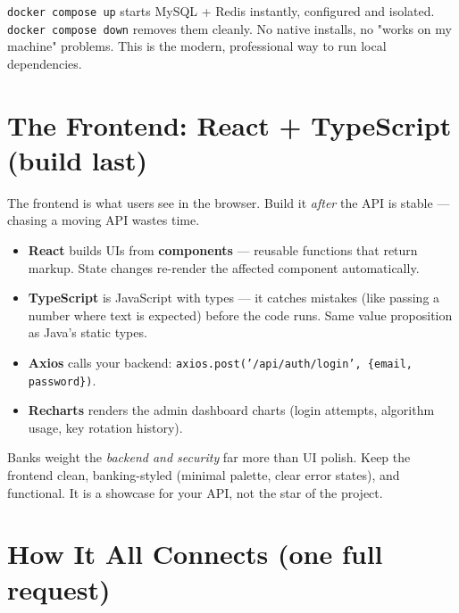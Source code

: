 \documentclass[11pt,a4paper]{article}
\begin{document}
\begin{keyidea}
\texttt{docker compose up} starts MySQL + Redis instantly, configured and isolated.
\texttt{docker compose down} removes them cleanly. No native installs, no "works on my machine"
problems. This is the modern, professional way to run local dependencies.
\end{keyidea}

\section{The Frontend: React + TypeScript (build last)}

The frontend is what users see in the browser. Build it \emph{after} the API is stable — chasing a
moving API wastes time.

\begin{itemize}[leftmargin=*]
  \item \textbf{React} builds UIs from \textbf{components} — reusable functions that return markup.
        State changes re-render the affected component automatically.
  \item \textbf{TypeScript} is JavaScript with types — it catches mistakes (like passing a number
        where text is expected) before the code runs. Same value proposition as Java's static types.
  \item \textbf{Axios} calls your backend: \texttt{axios.post('/api/auth/login', \{email, password\})}.
  \item \textbf{Recharts} renders the admin dashboard charts (login attempts, algorithm usage, key
        rotation history).
\end{itemize}

\begin{whymatters}
Banks weight the \emph{backend and security} far more than UI polish. Keep the frontend clean,
banking-styled (minimal palette, clear error states), and functional. It is a showcase for your
API, not the star of the project.
\end{whymatters}

\section{How It All Connects (one full request)}
\end{document}
